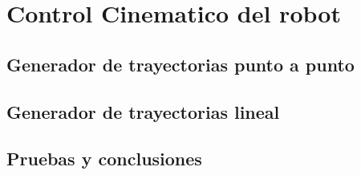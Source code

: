 \section{Control Cinematico del robot}
	\subsection{Generador de trayectorias punto a punto}
	\subsection{Generador de trayectorias lineal}
	\subsection{Pruebas y conclusiones}